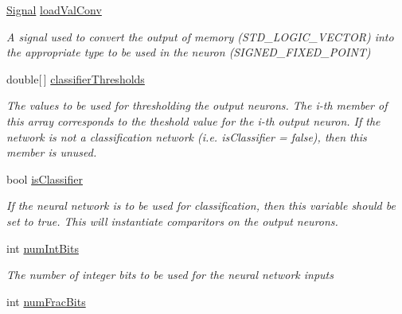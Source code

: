 \begin{DoxyCompactItemize}
\hyperlink{class_n_n_gen_1_1_signal}{Signal} \hyperlink{class_n_n_gen_1_1_async_neural_network_a559b0be95e6e62b80a0064de584805d3}{load\+Val\+Conv}
\begin{DoxyCompactList}\small\item\em A signal used to convert the output of memory (S\+T\+D\+\_\+\+L\+O\+G\+I\+C\+\_\+\+V\+E\+C\+T\+O\+R) into the appropriate type to be used in the neuron (S\+I\+G\+N\+E\+D\+\_\+\+F\+I\+X\+E\+D\+\_\+\+P\+O\+I\+N\+T) \end{DoxyCompactList}\item 
double\mbox{[}$\,$\mbox{]} \hyperlink{class_n_n_gen_1_1_async_neural_network_a9a2da98105807d64bf8d25f9f4279d3f}{classifier\+Thresholds}
\begin{DoxyCompactList}\small\item\em The values to be used for thresholding the output neurons. The i-\/th member of this array corresponds to the theshold value for the i-\/th output neuron. If the network is not a classification network (i.\+e. is\+Classifier = false), then this member is unused. \end{DoxyCompactList}\item 
bool \hyperlink{class_n_n_gen_1_1_async_neural_network_a07f0f12e804555587a5869b821e2ab0f}{is\+Classifier}
\begin{DoxyCompactList}\small\item\em If the neural network is to be used for classification, then this variable should be set to true. This will instantiate comparitors on the output neurons. \end{DoxyCompactList}\item 
int \hyperlink{class_n_n_gen_1_1_async_neural_network_aa792285911d8e4b6d402451efe7d57c2}{num\+Int\+Bits}
\begin{DoxyCompactList}\small\item\em The number of integer bits to be used for the neural network inputs \end{DoxyCompactList}\item 
int \hyperlink{class_n_n_gen_1_1_async_neural_network_a195b5331d3ed6f5babecb6e7e6b22cb7}{num\+Frac\+Bits}

\end{DoxyCompactItemize}
